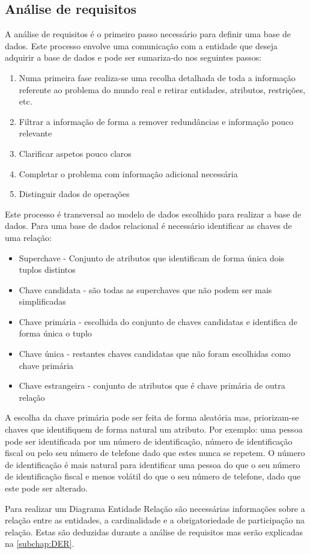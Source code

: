 \documentclass[11pt,twoside,a4paper]{report}
\begin{document}
\subsection{Análise de requisitos}
A análise de requisitos é o primeiro passo necessário para definir uma base de dados. Este processo envolve uma comunicação com a entidade que deseja adquirir a base de dados e pode ser sumariza-do nos seguintes passos:
\begin{enumerate}
	\item Numa primeira fase realiza-se uma recolha detalhada de toda a informação referente ao problema do mundo real e retirar entidades, atributos, restrições, etc.
	\item Filtrar a informação de forma a remover redundâncias e informação pouco relevante
	\item Clarificar aspetos pouco claros
	\item Completar o problema com informação adicional necessária
	\item Distinguir dados de operações
\end{enumerate}
Este processo é transversal ao modelo de dados escolhido para realizar a base de dados. Para uma base de dados relacional é necessário identificar as chaves de uma relação:
\begin{itemize}
	\item Superchave - Conjunto de atributos que identificam de forma única dois tuplos distintos
	\item Chave candidata - são todas as superchaves que não podem ser mais simplificadas
	\item Chave primária - escolhida do conjunto de chaves candidatas e identifica de forma única o tuplo
	\item Chave única - restantes chaves candidatas que não foram escolhidas como chave primária
	\item Chave estrangeira - conjunto de atributos que é chave primária de outra relação
\end{itemize}
A escolha da chave primária pode ser feita de forma aleatória mas, priorizam-se chaves que identifiquem de forma natural um atributo. Por exemplo: uma pessoa pode ser identificada por um número de identificação, número de identificação fiscal ou pelo seu número de telefone dado que estes nunca se repetem. O número de identificação é mais natural para identificar uma pessoa do que o seu número de identificação fiscal e menos volátil do que o seu número de telefone, dado que este pode ser alterado.\par 
Para realizar um Diagrama Entidade Relação são necessárias informações sobre a relação entre as entidades, a cardinalidade e a obrigatoriedade de participação na relação. Estas são deduzidas durante a análise de requisitos mas serão explicadas na \autoref{subchap:DER}.
\end{document}
